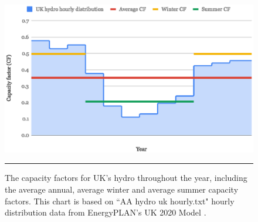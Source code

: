 \begin{figure}[htbp]
	\centering
	\includegraphics[width=\textwidth]{figures/Hydro_distribution.eps}
	\rule{\textwidth}{0.5pt} %
	\caption{The capacity factors for UK's hydro throughout the year, including the average annual, average winter and average summer capacity factors. This chart is based on ``AA hydro uk hourly.txt" hourly distribution data from EnergyPLAN's UK 2020 Model \citep{EnergyPLAN_UK2020}.}
	\label{fig:hydro_distribution}
\end{figure}